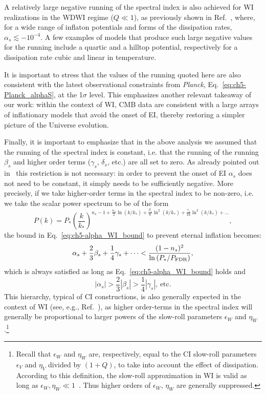 A relatively large negative running
of the spectral index is also achieved for WI realizations in the WDWI
regime ($Q\ll1$), as previously shown in Ref.~\cite{Benetti:2016jhf},
where, for a wide range of inflaton potentials  and forms of the
dissipation rates, $\alpha_s\lesssim-10^{-4}$. A few examples of models that produce such large negative values for the running include a quartic and a hilltop potential, respectively for a dissipation rate cubic and linear in temperature.

It is important to
stress that the values of the running quoted here are also consistent
with the latest observational constraints from \textit{Planck},
Eq.~\ref{eq:ch5-Planck_alphaS}, at the 1$\sigma$ level. This emphasizes another relevant takeaway of our work: within the context of WI, CMB data are consistent with a large
arrays of inflationary models that avoid the onset of EI, thereby
restoring a simpler picture of the Universe evolution.

Finally, it is important to emphasize that in the above analysis we assumed that the running of the spectral
index is constant, i.e. that the running of the running $\beta_s$ and
higher order terms ($\gamma_s$, $\delta_s$, etc.) are all set to
zero. As already pointed out in~\cite{Kinney:2014jya} this restriction
is not necessary: in order to prevent the onset of EI $\alpha_s$ does
not need to be constant, it simply needs to be sufficiently
negative. More precisely, if we take higher-order terms in the
spectral index to be non-zero, i.e. we take the scalar power spectrum to be of the form
\begin{equation}
    P(k)=P_*\left(\frac{k}{k_*}\right)^{n_s-1+\frac{\alpha_s}{2}\ln(k/k_*)+\frac{\beta_s}{6}\ln^2(k/k_*)+\frac{\gamma_s}{24}\ln^3(k/k_*)+\dots},
\end{equation}
the bound in
Eq.~\ref{eq:ch5-alpha_WI_bound} to prevent eternal inflation
becomes:
\begin{equation}
\alpha_s+\frac{2}{3}\beta_s+\frac{1}{4}\gamma_s+\cdots <
\frac{(1-n_s)^2}{\ln\left(P_*/P_{\rm{FDR}}\right)},
\end{equation}
%
which is always satisfied as long as Eq.~\ref{eq:ch5-alpha_WI_bound}
holds and
\begin{equation}
    |\alpha_s|>\frac{2}{3}|\beta_s|>\frac{1}{4}|\gamma_s|,\,\text{etc.}
\end{equation}
 This hierarchy, typical of CI constructions, is also generally
expected in the context of WI (see, e.g., Ref.~\cite{Das:2022ubr}), as
higher order-terms in the spectral index will generally be
proportional to larger powers of the slow-roll parameters $\epsilon_W$
and $\eta_W$.\footnote{Recall that $\epsilon_W$ and $\eta_W$ are,
respectively, equal to the CI slow-roll parameters $\epsilon_V$ and
$\eta_V$ divided by $(1+Q)$, to take into account the effect of
dissipation. According to this definition, the slow-roll approximation
in WI is valid as long as   $\epsilon_W,\eta_W \ll
1$~\cite{Berera:2008ar}. Thus higher orders of $\epsilon_W$, $\eta_W$
are generally suppressed.}


